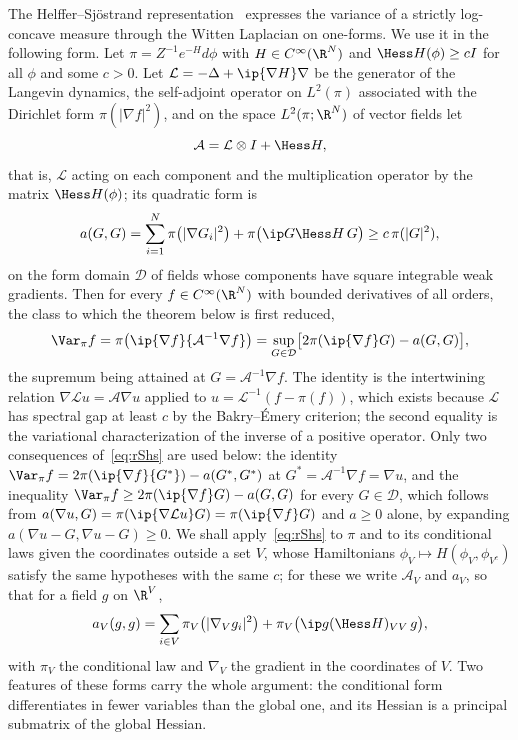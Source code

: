 The Helffer--Sj\"ostrand representation~\cite{HS94,Hel98} expresses the
variance of a strictly log-concave measure through the Witten Laplacian on
one-forms. We use it in the following form. Let $\pi=Z^{-1}e^{-H}d\phi$ with
$H\in C^\infty(\R^N)$ and $\Hess H(\phi)\ge cI$ for all $\phi$ and some
$c>0$. Let $\mathcal L=-\Delta+\ip{\nabla H}\nabla$ be the generator of the
Langevin dynamics, the self-adjoint operator on $L^2(\pi)$ associated with the
Dirichlet form $\pi(\lvert\nabla f\rvert^2)$, and on the space $L^2(\pi;\R^N)$
of vector fields let
\begin{equation}\label{eq:rSwitten}
\mathcal A=\mathcal L\otimes I+\Hess H,
\end{equation}
that is, $\mathcal L$ acting on each component and the multiplication
operator by the matrix $\Hess H(\phi)$; its quadratic form is
\[
a(G,G)=\sum_{i=1}^N\pi\bigl(\lvert\nabla G_i\rvert^2\bigr)+\pi\bigl(\ip G
{\Hess H\,G}\bigr)\ge c\,\pi(\lvert G\rvert^2),
\]
on the form domain $\mathcal D$ of fields whose components have square
integrable weak gradients. Then for every $f\in C^\infty(\R^N)$ with bounded
derivatives of all orders, the class to which the theorem below is first
reduced,
\begin{equation}\label{eq:rShs}
\Var_\pi f=\pi\bigl(\ip{\nabla f}{\mathcal A^{-1}\nabla f}\bigr)=\sup_{G\in
\mathcal D}\bigl[2\pi(\ip{\nabla f}G)-a(G,G)\bigr],
\end{equation}
the supremum being attained at $G=\mathcal A^{-1}\nabla f$. The identity is
the intertwining relation $\nabla\mathcal Lu=\mathcal A\nabla u$ applied to
$u=\mathcal L^{-1}(f-\pi(f))$, which exists because $\mathcal L$ has
spectral gap at least $c$ by the Bakry--\'Emery criterion; the second
equality is the variational characterization of the inverse of a positive
operator. Only two consequences of~\eqref{eq:rShs} are used below: the
identity $\Var_\pi f=2\pi(\ip{\nabla f}{G^*})-a(G^*,G^*)$ at $G^*=\mathcal
A^{-1}\nabla f=\nabla u$, and the inequality $\Var_\pi f\ge2\pi(\ip{\nabla f}
G)-a(G,G)$ for every $G\in\mathcal D$, which follows from $a(\nabla u,G)=\pi
(\ip{\nabla\mathcal Lu}G)=\pi(\ip{\nabla f}G)$ and $a\ge0$ alone, by
expanding $a(\nabla u-G,\nabla u-G)\ge0$. We shall apply~\eqref{eq:rShs} to
$\pi$ and to its conditional laws given the coordinates outside a set $V$,
whose Hamiltonians $\phi_V\mapsto H(\phi_V,\phi_{V^c})$ satisfy the same
hypotheses with the same $c$; for these we write $\mathcal A_V$ and $a_V$, so
that for a field $g$ on $\R^V$,
\[
a_V(g,g)=\sum_{i\in V}\pi_V\bigl(\lvert\nabla_Vg_i\rvert^2\bigr)+\pi_V\bigl(
\ip g{(\Hess H)_{VV}\,g}\bigr),
\]
with $\pi_V$ the conditional law and $\nabla_V$ the gradient in the
coordinates of $V$. Two features of these forms carry the whole argument:
the conditional form differentiates in fewer variables than the global one,
and its Hessian is a principal submatrix of the global Hessian.

